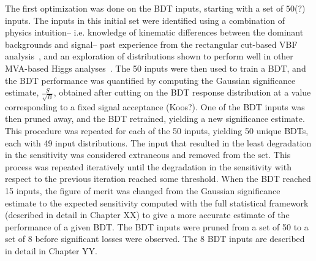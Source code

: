 The first optimization was done on the
BDT inputs, starting with a set of $50$(?) inputs. The inputs in this
initial set were identified using a combination of physics intuition--
i.e. knowledge of kinematic differences between the dominant
backgrounds and signal-- past experience from the rectangular
cut-based VBF analysis~\cite{bib:hww_moriond_2013}, and an exploration of
distributions shown to perform well in other MVA-based Higgs
analyses~\cite{bib:htautau_mva}. The 50 inputs were then used to
train a BDT, and the BDT performance was quantified by computing the
Gaussian significance estimate, $\frac{S}{\sqrt{B}}$, obtained after
cutting on the BDT response distribution at a value corresponding to a
fixed signal acceptance (Koos?). One of the BDT inputs was then pruned
away, and the BDT retrained, yielding a new significance
estimate. This procedure was repeated for each of the 50 inputs,
yielding 50 unique BDTs, each with 49 input distributions. The input
that resulted in the least degradation in the sensitivity was
considered extraneous and removed from the set. This process was
repeated iteratively until the degradation in the sensitivity with
respect to the previous iteration reached some threshold. When the BDT
reached 15 inputs, the figure of merit was changed from the Gaussian
significance estimate to the expected sensitivity computed with the
full statistical framework (described in detail in
Chapter XX) to give a more accurate estimate of the
performance of a given BDT. The BDT inputs were pruned from a set of
50 to a set of 8 before significant losses were observed. The 8 BDT
inputs are described in detail in Chapter YY. 

